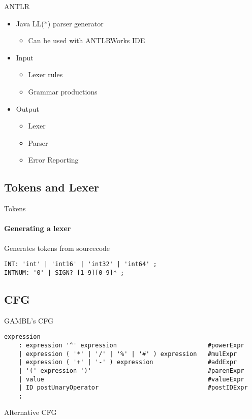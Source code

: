 \begin{frame}{ANTLR}
 \begin{itemize}
    \item Java LL(*) parser generator
    \begin{itemize}
      \item Can be used with ANTLRWorks IDE
    \end{itemize}
    \item Input
    \begin{itemize}
      \item Lexer rules
      \item Grammar productions
    \end{itemize}
    \item Output
    \begin{itemize}
      \item Lexer
      \item Parser
      \item Error Reporting
    \end{itemize}
  \end{itemize}
\end{frame}


\subsection{Tokens and Lexer}
\begin{frame}[fragile]{Tokens}
\framesubtitle{Generating a lexer}
 Generates tokens from sourcecode

\begin{lstlisting}[caption=Example af lexer rules in GAMBL.,frame=tlrb, basicstyle=\tiny, numbers=none]
INT: 'int' | 'int16' | 'int32' | 'int64' ;
INTNUM: '0' | SIGN? [1-9][0-9]* ;
\end{lstlisting}
\end{frame}


\subsection{CFG}
\begin{frame}[fragile]{GAMBL's CFG}
 \begin{lstlisting}[caption=Grammar rules for the expression production in GAMBL.,frame=tlrb, basicstyle=\tiny, numbers=none]
expression
    : expression '^' expression                         #powerExpr
    | expression ( '*' | '/' | '%' | '#' ) expression   #mulExpr
    | expression ( '+' | '-' ) expression               #addExpr
    | '(' expression ')'                                #parenExpr
    | value                                             #valueExpr
    | ID postUnaryOperator                              #postIDExpr
    ;
\end{lstlisting}
\end{frame}

\begin{frame}{Alternative CFG}

\end{frame}


